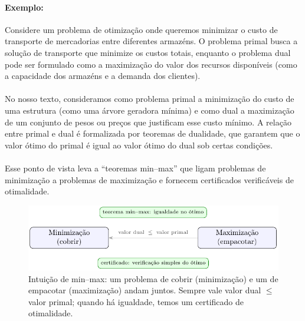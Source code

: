 \documentclass[12pt,a4paper]{article}
\def\emph#1{#1}%
\begin{document}
\paragraph{Exemplo:}
Considere um problema de otimização onde queremos minimizar o custo de transporte de mercadorias entre diferentes armazéns. O problema primal busca a solução de transporte que minimize os custos totais, enquanto o problema dual pode ser formulado como a maximização do valor dos recursos disponíveis (como a capacidade dos armazéns e a demanda dos clientes).

\paragraph{}
No nosso texto, consideramos como problema primal a minimização do custo de uma estrutura (como uma árvore geradora mínima) e como dual a maximização de um conjunto de pesos ou preços que justificam esse custo mínimo. A relação entre primal e dual é formalizada por teoremas de dualidade, que garantem que o valor ótimo do primal é igual ao valor ótimo do dual sob certas condições.

\paragraph{}
Esse ponto de vista leva a “teoremas min–max” que ligam problemas de \emph{minimização} a problemas de \emph{maximização} e fornecem certificados verificáveis de otimalidade.


\begin{figure}[H]
    \centering
    \includegraphics[width=0.9\linewidth]{figures/fig_min_max_cert.pdf}

    \caption{Intuição de min--max: um problema de cobrir (minimização) e um de empacotar (maximização) andam juntos. Sempre vale valor dual $\le$ valor primal; quando há igualdade, temos um certificado de otimalidade.}
    \label{fig:min-max-cert}\end{figure}
\end{document}
